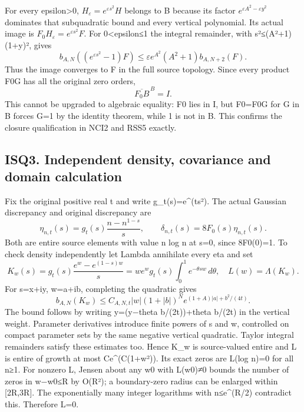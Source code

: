 \documentclass[
]{article}
\begin{document}
For every epsilon\textgreater0, \(H_\varepsilon=e^{\varepsilon s^2}H\) belongs to B because its factor \(e^{\varepsilon A^2-\varepsilon y^2}\) dominates that subquadratic bound and every vertical polynomial. Its actual image is \(F_0H_\varepsilon=e^{\varepsilon s^2}F\). For 0\textless epsilon≤1 the integral remainder, with \textbar s\textbar²≤(A²+1)(1+\textbar y\textbar)², gives \[
b_{A,N}((e^{\varepsilon s^2}-1)F)
\le\varepsilon e^{A^2}(A^2+1)b_{A,N+2}(F).
\tag{ISQ2.3}
\] Thus the image converges to F in the full source topology. Since every product F0G has all the original zero orders, \[
\overline{F_0B}^{\,B}=I.
\tag{ISQ2.4}
\] This cannot be upgraded to algebraic equality: F0 lies in I, but F0=F0G for G in B forces G=1 by the identity theorem, while 1 is not in B. This confirms the closure qualification in NCI2 and RSS5 exactly.

\subsection{ISQ3. Independent density, covariance and domain calculation}\label{isq3.-independent-density-covariance-and-domain-calculation}

Fix the original positive real t and write g\_t(s)=e\^{}(ts²). The actual Gaussian discrepancy and original discrepancy are \[
\eta_{n,t}(s)=g_t(s)\frac{n-n^{1-s}}s,
\qquad\delta_{n,t}(s)=8F_0(s)\eta_{n,t}(s).
\tag{ISQ3.1}
\] Both are entire source elements with value n log n at s=0, since 8F0(0)=1. To check density independently let Lambda annihilate every eta and set \[
K_w(s)=g_t(s)\frac{e^w-e^{(1-s)w}}s
=we^wg_t(s)\int_0^1e^{-\theta sw}\,d\theta,
\quad L(w)=\Lambda(K_w).
\] For s=x+iy, w=a+ib, completing the quadratic gives \[
b_{A,N}(K_w)\le C_{A,N,t}|w|(1+|b|)^N
e^{(1+A)|a|+b^2/(4t)}.
\tag{ISQ3.2}
\] The bound follows by writing y=(y−theta b/(2t))+theta b/(2t) in the vertical weight. Parameter derivatives introduce finite powers of s and w, controlled on compact parameter sets by the same negative vertical quadratic. Taylor integral remainders satisfy these estimates too. Hence K\_w is source-valued entire and L is entire of growth at most Ce\^{}(C(1+\textbar w\textbar²)). Its exact zeros are L(log n)=0 for all n≥1. For nonzero L, Jensen about any w0 with L(w0)≠0 bounds the number of zeros in \textbar w−w0\textbar≤R by O(R²); a boundary-zero radius can be enlarged within {[}2R,3R{]}. The exponentially many integer logarithms with n≤e\^{}(R/2) contradict this. Therefore L=0.
\end{document}

